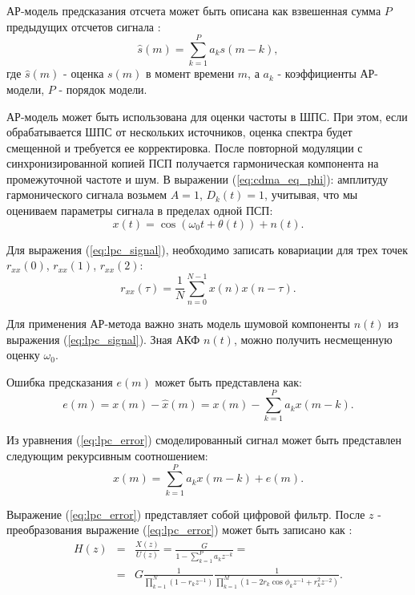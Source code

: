 АР-модель предсказания отсчета может быть описана как взвешенная сумма ${P}$ предыдущих отсчетов сигнала \cite{marpl_book}:
\begin{equation}
	\label{eq:lpc_forecast}
	\hat{s}(m) = \sum \limits_{k=1}^P a_k s(m-k),
\end{equation}
где ${\hat{s}(m)}$ - оценка ${s(m)}$ в момент времени ${m}$, а ${a_k}$ - коэффициенты АР-модели, ${P}$ - порядок модели.

АР-модель может быть использована для оценки частоты в ШПС. При этом, если обрабатывается ШПС от нескольких источников,
оценка спектра будет смещенной и требуется ее корректировка. После повторной модуляции
с синхронизированной копией ПСП получается гармоническая компонента на промежуточной частоте и шум. 
В выражении (\ref{eq:cdma_eq_phi}): амплитуду гармонического сигнала возьмем ${A = 1}$, ${D_k(t)=1}$, учитывая, что мы оцениваем параметры сигнала в пределах одной
ПСП:
\begin{equation}
	\label{eq:lpc_signal}
	x(t) = \cos(\omega_{0}t + \theta(t)) + n(t).
\end{equation}

Для выражения (\ref{eq:lpc_signal}), необходимо записать ковариации для трех точек
${r_{xx}(0)}$, ${r_{xx}(1)}$, ${r_{xx}(2)}$:
\begin{equation}
	\label{eq:lpc_cov}
	{r_{xx}(\tau) = \frac{1}{N} \sum \limits_{n=0}^{N-1} x(n) x(n-\tau)}.
\end{equation}

Для применения АР-метода важно знать модель шумовой компоненты ${n(t)}$ из выражения
(\ref{eq:lpc_signal}). Зная АКФ ${n(t)}$, можно получить несмещенную оценку ${\omega_0}$.

Ошибка предсказания ${e(m)}$ может быть представлена как:
\begin{equation}
	\label{eq:lpc_error}
	e(m) = x(m) - \hat{x}(m) = x(m) - \sum \limits_{k=1}^P a_k x(m-k).
\end{equation}

Из уравнения (\ref{eq:lpc_error}) смоделированный сигнал может быть представлен следующим рекурсивным соотношением:
\begin{equation}
	\label{eq:lpc_signal_from_ar}
	x(m) = \sum \limits_{k=1}^P a_k x(m-k) + e(m).
\end{equation}

Выражение (\ref{eq:lpc_error}) представляет собой цифровой фильтр.
После ${z}$ - преобразования выражение (\ref{eq:lpc_error}) может быть записано как \cite{saeed_book}:
\begin{eqnarray}
	\label{eq:lpc_z}
		H(z)	& = & \frac{X(z)}{U(z)} = \frac{G}{1 - \sum \limits_{k=1}^P a_kz^{-k}} =  \nonumber \\
			& = & G\frac{1}{\prod \limits_{k=1}^N (1-r_kz^{-1})} \frac{1}{\prod \limits_{k=1}^M (1-2r_k \cos \phi_k z^{-1} + r_k^2z^{-2})}.
\end{eqnarray}

